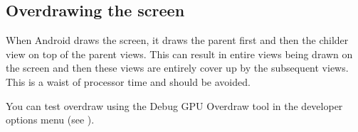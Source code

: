 \subsection{Overdrawing the screen}
When Android draws the screen, it draws the parent first and then the childer view on top of the parent views. This can result in entire views being drawn on the screen and then these views are entirely cover up by the subsequent views. This is a waist of processor time and should be avoided. 

You can test overdraw using the Debug GPU Overdraw tool in the developer options menu (see \cite{Google2017b}).

 

